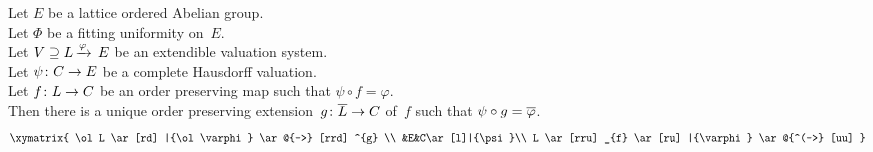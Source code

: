 \documentclass[main.tex]{subfiles}
\begin{document}
%
%
\begin{thm}
\label{T:fubext}
Let $E$ be a lattice ordered Abelian group.\\
Let $\Phi$ be a fitting uniformity on~$E$.\\
Let $V \supseteq L\,\smash{\xrightarrow{\varphi}\,E}$ be an extendible valuation system.\\
Let $\psi\colon C\rightarrow E$ be 
a complete Hausdorff valuation.\\
Let $f\colon L\rightarrow C$ be an order preserving map such that 
$\psi\circ f = \varphi$.\\
Then there is a unique
order preserving extension~$g\colon \overline L \rightarrow C$ of~$f$
such that $\psi\circ g = \overline\varphi$.
\begin{equation*}
\xymatrix{
\ol L \ar [rd] |{\ol\varphi} 
\ar @{-->} [rrd] ^{g} \\
&E&C\ar[l]|{\psi}\\
L \ar [rru] _{f}
\ar [ru] |{\varphi}
\ar @{^(->} [uu] 
}
\end{equation*}
\end{thm}
\end{document}
